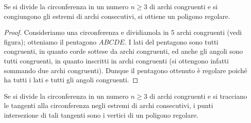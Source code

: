 \begin{figure}[!htb]
	\begin{center}
		\begin{minipage}{0.45\textwidth}
			\centering
			
		\end{minipage}
		\hspace{0.03\textwidth}	
		\begin{minipage}{0.45\textwidth}
			\centering
			
		\end{minipage}
	\end{center}
\end{figure}
\begin{figure}[!htb]
	\begin{center}
		\begin{minipage}{0.45\textwidth}
			\centering
			
		\end{minipage}
		\hspace{0.03\textwidth}	
		\begin{minipage}{0.45\textwidth}
			\centering
			
		\end{minipage}
	\end{center}
\end{figure}


\begin{teorema}
Se si divide la circonferenza in un numero $n\geq 3$ di archi congruenti e si congiungono gli estremi di archi consecutivi, si ottiene un poligono regolare.
\end{teorema}

\begin{figure}[!htb]
	\centering
\end{figure}

\begin{proof}
Consideriamo una circonferenza e dividiamola in 5 archi congruenti (vedi figura); otteniamo il pentagono $ABCDE$.
I lati del pentagono sono tutti congruenti, in quanto corde sottese da archi congruenti, ed anche gli angoli sono tutti congruenti, in quanto inscritti in archi congruenti (si ottengono infatti sommando due archi congruenti).
Dunque il pentagono ottenuto è regolare poiché ha tutti i lati e tutti gli angoli congruenti.
\end{proof}

\begin{teorema}
Se si divide la circonferenza in un numero $n\geq 3$ di archi congruenti e si tracciano le tangenti alla circonferenza negli  estremi di archi consecutivi, i punti intersezione di tali tangenti sono i vertici di un poligono regolare.
\end{teorema}

